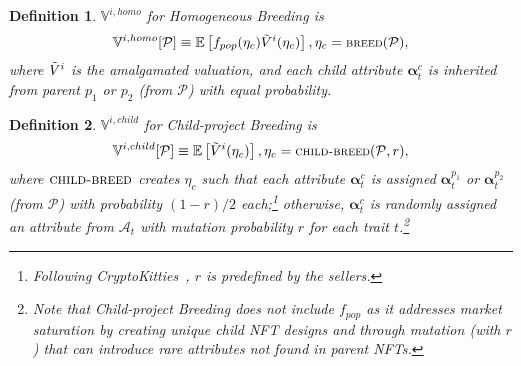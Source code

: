 \documentclass[conference]{IEEEtran}
\theoremstyle{plain}
\newtheorem{definition}{Definition}
\newcommand*{\defeq}{\equiv}
\begin{document}
\begin{definition}
    \label{def:homogeneous-breeding}
    $\mathbb{V}^{i, homo}$ for Homogeneous Breeding\xspace is
    \begin{equation}\small
    \label{eqn:homob-utility}
     \mathbb{V}^{i, homo}[\mathcal{P}] \defeq \mathbb{E}\left[f_{pop}(\eta_c)\Tilde{V}^i(\eta_c)\right], \eta_c = \textsc{breed}(\mathcal{P}),
    \end{equation}
    where $\Tilde{V}^i$ is the amalgamated valuation, and each child attribute $\bm{\alpha}^c_t$ is inherited from parent $p_1$ or $p_2$ (from $\mathcal{P}$) with equal probability.
\end{definition}
    

\begin{definition}
    \label{def:child-project-breeding} 
    $\mathbb{V}^{i, child}$ for Child-project Breeding\xspace is
    \begin{equation}\small 
         \mathbb{V}^{i, child}[\mathcal{P}] \defeq \mathbb{E}\left[\Tilde{V}^i(\eta_c)\right], \eta_c = \textsc{child-breed}(\mathcal{P}, r),
    \end{equation} 
    where $\textsc{child-breed}$ creates $\eta_c$ such that each attribute $\bm{\alpha}^c_t$ is assigned $\bm{\alpha}^{p_1}_t$ or $\bm{\alpha}^{p_2}_t$ (from $\mathcal{P}$) with probability $(1-r)/2$ each;\footnote{Following \textit{CryptoKitties}~, $r$ is predefined by the sellers.} otherwise, $\bm{\alpha}^c_t$ is randomly assigned an attribute from $\mathcal{A}_t$ with mutation probability $r$ for each trait $t$.\footnote{Note that Child-project Breeding\xspace does not include $f_{pop}$ as it addresses market saturation by creating unique child NFT designs and through mutation (with $r$) that can introduce rare attributes not found in parent NFTs.}
\end{definition}
\end{document}
